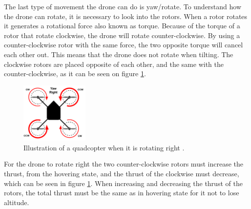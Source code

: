 \newline
The last type of movement the drone can do is yaw/rotate. To understand how the drone can rotate, it is necessary to look into the rotors. When a rotor rotates it generates a rotational force also known as torque. Because of the torque of a rotor that rotate clockwise, the drone will rotate counter-clockwise. By using a counter-clockwise rotor with the same force, the two opposite torque will cancel each other out\cite{PhysicsofDroneFlight}. This means that the drone does not rotate when tilting. The clockwise rotors are placed opposite of each other, and the same with the counter-clockwise, as it can be seen on figure \ref{fig:dronePhysics_4}.
\newline
\begin{figure}[h]
    \centering
    \includegraphics[width=0.3\textwidth]{figures/ch_intro/physics-of-multirotor-4.png}
    \caption{Illustration of a quadcopter when it is rotating right \cite[Redrawn]{PhysicsofDroneFlight}.}
    \label{fig:dronePhysics_4}
\end{figure}
\newline
For the drone to rotate right the two counter-clockwise rotors must increase the thrust, from the hovering state, and the thrust of the clockwise must decrease, which can be seen in figure \ref{fig:dronePhysics_4}. When increasing and decreasing the thrust of the rotors, the total thrust must be the same as in hovering state for it not to lose altitude. 